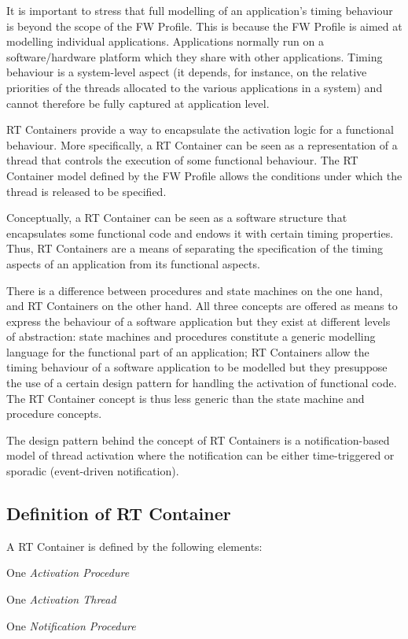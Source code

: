 \documentclass[definition]{../fwprofile}
\begin{document}
It is important to stress that full modelling of an application's timing behaviour is beyond the
scope of the FW Profile. This is because the FW Profile is aimed at modelling individual
applications. Applications normally run on a software/hardware platform which they share
with other applications. Timing behaviour is a system-level aspect (it depends, for instance, on
the relative priorities of the threads allocated to the various applications in a system) and
cannot therefore be fully captured at application level.

RT Containers provide a way to encapsulate the activation logic for a functional behaviour.
More specifically, a RT Container can be seen as a representation of a thread that controls the
execution of some functional behaviour. The RT Container model defined by the FW Profile
allows the conditions under which the thread is released to be specified.

Conceptually, a RT Container can be seen as a software structure that encapsulates some
functional code and endows it with certain timing properties. Thus, RT Containers are a means
of separating the specification of the timing aspects of an application from its functional
aspects.

There is a difference between procedures and state machines on the one hand, and RT Containers on the other hand. All three concepts are offered as means to express the behaviour
of a software application but they exist at different levels of abstraction: state machines and
procedures constitute a generic modelling language for the functional part of an application;
RT Containers allow the timing behaviour of a software application to be modelled but they
presuppose the use of a certain design pattern for handling the activation of functional code.
The RT Container concept is thus less generic than the state machine and procedure concepts.

The design pattern behind the concept of RT Containers is a notification-based model of thread
activation where the notification can be either time-triggered or sporadic (event-driven
notification).

\subsection{Definition of RT Container}
A RT Container is defined by the following elements:

\begin{fw_itemize} 
\item One \emph{Activation Procedure}
\item One \emph{Activation Thread}
\item One \emph{Notification Procedure} 
\end{fw_itemize}
\end{document}
